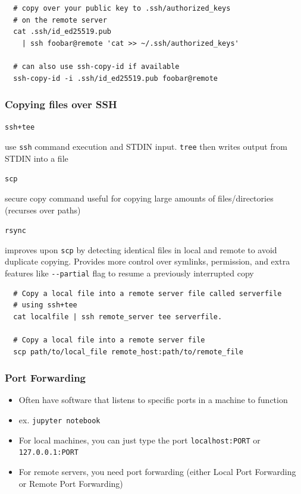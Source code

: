 \documentclass[letterpaper,12pt]{article}
\newcommand*{\lstitem}[1]{
  \setbox0\hbox{\lstinline{#1}}
  \item[\usebox0]
}
\begin{document}
\begin{lstlisting}
  # copy over your public key to .ssh/authorized_keys
  # on the remote server
  cat .ssh/id_ed25519.pub
    | ssh foobar@remote 'cat >> ~/.ssh/authorized_keys'

  # can also use ssh-copy-id if available
  ssh-copy-id -i .ssh/id_ed25519.pub foobar@remote
\end{lstlisting}

\subsubsection{Copying files over SSH}
\begin{description}
 \lstitem{ssh+tee} use \lstinline{ssh} command execution and STDIN input. \lstinline{tree} then writes output from STDIN into a file
 \lstitem{scp} secure copy command useful for copying large amounts of files/directories (recurses over paths)
 \lstitem{rsync} improves upon \lstinline{scp} by detecting identical files in local and remote to avoid duplicate copying. Provides more control over symlinks, permission, and extra features like \lstinline{--partial} flag to resume a previously interrupted copy
\end{description}

\begin{lstlisting}
  # Copy a local file into a remote server file called serverfile
  # using ssh+tee
  cat localfile | ssh remote_server tee serverfile.

  # Copy a local file into a remote server file
  scp path/to/local_file remote_host:path/to/remote_file
\end{lstlisting}

\subsubsection{Port Forwarding}
\begin{itemize}
 \item Often have software that listens to specific ports in a machine to function
 \item ex. \lstinline{jupyter notebook}
 \item For local machines, you can just type the port \lstinline{localhost:PORT} or \lstinline{127.0.0.1:PORT}
 \item For remote servers, you need port forwarding (either Local Port Forwarding or Remote Port Forwarding)
\end{itemize}
\end{document}
